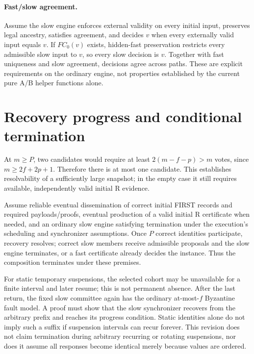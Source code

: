 \documentclass[11pt]{article}
\begin{document}
\paragraph{Fast/slow agreement.}
Assume the slow engine enforces external validity on every initial input,
preserves legal ancestry, satisfies agreement, and decides $v$ when every
externally valid input equals $v$. If $FC_0(v)$ exists, hidden-fast preservation
restricts every admissible slow input to $v$, so every slow decision is $v$.
Together with fast uniqueness and slow agreement, decisions agree across paths.
These are explicit requirements on the ordinary engine, not properties established
by the current pure A/B helper functions alone.

\section{Recovery progress and conditional termination}
At $m\geq P$, two candidates would require at least $2(m-f-p)>m$ votes, since
$m\geq2f+2p+1$. Therefore there is at most one candidate. This establishes
resolvability of a sufficiently large snapshot; in the empty case it still
requires available, independently valid initial R evidence.

Assume reliable eventual dissemination of correct initial FIRST records and
required payloads/proofs, eventual production of a valid initial R certificate
when needed, and an ordinary slow engine satisfying termination under the
execution's scheduling and synchronizer assumptions. Once $P$ correct identities
participate, recovery resolves; correct slow members receive admissible proposals
and the slow engine terminates, or a fast certificate already decides the instance.
Thus the composition terminates under these premises.

For static temporary suspensions, the selected cohort may be unavailable for a
finite interval and later resume; this is not permanent absence. After the last
return, the fixed slow committee again has the ordinary at-most-$f$ Byzantine
fault model. A proof must show that the slow synchronizer recovers from the
arbitrary prefix and reaches its progress condition. Static identities alone do
not imply such a suffix if suspension intervals can recur forever. This revision
does not claim termination during arbitrary recurring or rotating suspensions,
nor does it assume all responses become identical merely because values are ordered.
\end{document}
